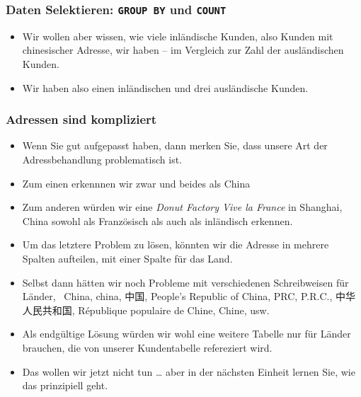 \documentclass[aspectratio=169,mathserif,notheorems]{beamer}%
\begin{document}
%
\begin{frame}[t]
\frametitle{Daten Selektieren: \texttt{GROUP BY} und \texttt{COUNT}}%
\begin{itemize}%
\item Wir wollen aber wissen, \alert{wie viele} inländische Kunden, also Kunden mit chinesischer Adresse, wir haben -- im Vergleich zur Zahl der ausländischen Kunden.%
%
\item<6-> Wir haben also einen inländischen und drei ausländische Kunden.%
\end{itemize}%
%
%
\end{frame}
%
\begin{frame}%
\frametitle{Adressen sind kompliziert}%
\begin{itemize}%
\item Wenn Sie gut aufgepasst haben, dann merken Sie, dass unsere Art der Adressbehandlung problematisch ist.%
\item<2-> Zum einen erkennnen wir zwar  und  beides als China%
\item<3-> Zum anderen würden wir eine \emph{Donut Factory Vive la France} in Shanghai, China sowohl als Französisch als auch als inländisch erkennen.%
\item<4-> Um das letztere Problem zu lösen, könnten wir die Adresse in mehrere Spalten aufteilen, mit einer Spalte für das Land.%
\item<5-> Selbst dann hätten wir noch Probleme mit verschiedenen Schreibweisen für Länder, \DEzB~China, china, 中国, People's Republic of China, PRC, P.R.C., 中华人民共和国, République populaire de Chine, Chine, usw.%
\item<6-> Als endgültige Lösung würden wir wohl eine weitere Tabelle nur für Länder brauchen, die von unserer Kundentabelle refereziert wird.%
\item<7-> Das wollen wir jetzt nicht tun {\dots} aber in der nächsten Einheit lernen Sie, wie das prinzipiell geht.%
\end{itemize}%
\end{frame}%
%
\end{document}
